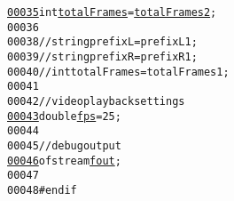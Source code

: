 \begin{footnotesize}
\begin{alltt}
\hypertarget{config_8h_source_l00035}{}\hyperlink{config_8h_a0186bee82f4d469206cfcb18da843a46}{00035} \textcolor{keywordtype}{int} \hyperlink{config_8h_a0186bee82f4d469206cfcb18da843a46}{totalFrames} = \hyperlink{config_8h_a30f8e88254cae72861ca9f1082036f13}{totalFrames2};
00036 
00038 \textcolor{comment}{//string prefixL = prefixL1;}
00039 \textcolor{comment}{//string prefixR = prefixR1;}
00040 \textcolor{comment}{//int totalFrames = totalFrames1;}
00041 
00042 \textcolor{comment}{// video playback settings}
\hypertarget{config_8h_source_l00043}{}\hyperlink{config_8h_a63da2a617b72a1630998a4d8b4d26cd3}{00043} \textcolor{keywordtype}{double} \hyperlink{config_8h_a63da2a617b72a1630998a4d8b4d26cd3}{fps} = 25;
00044 
00045 \textcolor{comment}{// debug output}
\hypertarget{config_8h_source_l00046}{}\hyperlink{config_8h_a0a2814a2252fee90794304506ef2e9c0}{00046} ofstream \hyperlink{config_8h_a0a2814a2252fee90794304506ef2e9c0}{fout};
00047 
00048 \textcolor{preprocessor}{#endif}
\end{alltt}\end{footnotesize}
